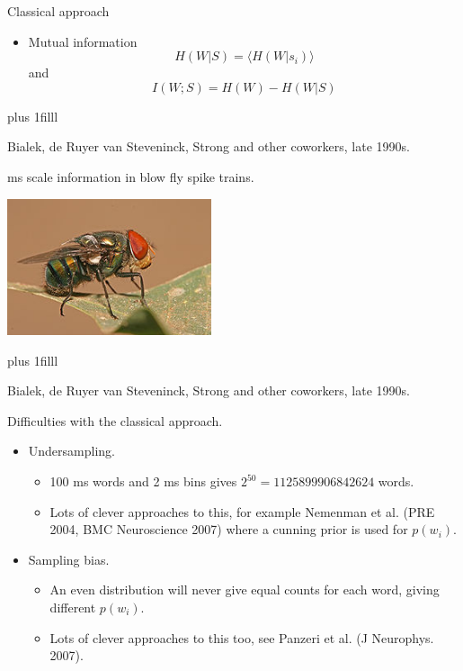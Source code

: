 \documentclass{beamer}
\newcommand{\btVFill}{\vskip0pt plus 1filll}
\begin{document}
\begin{frame}{Classical approach}
\begin{itemize}
\item Mutual information
\color{dark}
$$H(W|S)=\langle H(W|s_i)\rangle$$
\color{black}
and
\color{dark}
$$I(W;S)=H(W)-H(W|S)$$
\color{black}
\end{itemize}
\btVFill
\begin{flushright}
\color{gray}
  \tiny{Bialek, de Ruyer van Steveninck, Strong and other coworkers, late 1990s.}
\end{flushright}
\color{black}
\end{frame}


\begin{frame}{ms scale information in blow fly spike trains.}
\begin{center}
\includegraphics[width=6cm]{blow_fly.jpg}
\end{center}
\btVFill
\begin{flushright}
  \color{gray}
\tiny{Bialek, de Ruyer van Steveninck, Strong and other coworkers, late 1990s.}
\color{black}
\end{flushright}
\end{frame}



\begin{frame}{Difficulties with the classical approach.}
\begin{itemize}
\item Undersampling. 
\begin{itemize}
\item 100 ms words and 2 ms bins gives $2^{50}=1125899906842624$ words.
\item Lots of clever approaches to this, for example Nemenman et al. (PRE 2004, BMC Neuroscience 2007) where a cunning prior is used for $p(w_i)$.
\end{itemize}
\item Sampling bias.
\begin{itemize}
\item An even distribution will never give equal counts for each word,
  giving different $p(w_i)$.
\item Lots of clever approaches to this too, see Panzeri et al. (J Neurophys. 2007).
\end{itemize}
\end{itemize}
\end{frame}
\end{document}
